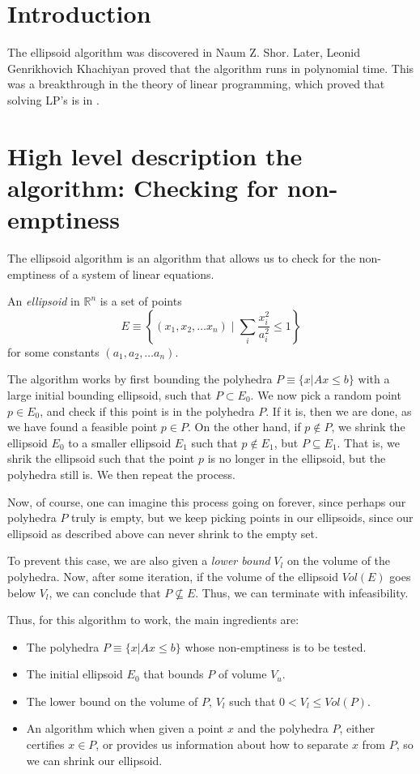 \documentclass[conference]{IEEEtran}
\begin{document}
\section{Introduction}
The ellipsoid algorithm was discovered in Naum Z. Shor. Later, 
Leonid Genrikhovich Khachiyan proved that the algorithm runs in polynomial
time. This was a breakthrough in the theory of linear programming, which
proved that solving LP's is in \PTIME.

\section{High level description the algorithm: Checking for non-emptiness}
The ellipsoid algorithm is an algorithm that allows us to check for the
non-emptiness of a system of linear equations. 


An \textit{ellipsoid} in $\mathbb{R}^n$ is a set of points
\[E \equiv \left\{ (x_1, x_2, \dots x_n) \mid \sum_i \frac{x_i^2}{a_i^2} \leq 1 \right\}\] for some
constants $(a_1, a_2, \dots a_n)$. 

The algorithm works by first bounding the polyhedra $P \equiv \{ x | Ax \leq b \}$ 
with a large initial bounding ellipsoid, such that $P \subset E_0$. We now pick a
random point $p \in E_0$, and check if this point is in the polyhedra $P$. If it
is, then we are done, as we have found a feasible point $p \in P$. On the
other hand, if $p \notin P$, we shrink the ellipsoid $E_0$ to a smaller
ellipsoid $E_1$ such that $p \notin E_1$, but $P \subseteq E_1$. That is,
we shrik the ellipsoid such that the point $p$ is no longer in the ellipsoid,
but the polyhedra still is. We then repeat the process.

Now, of course, one can imagine this process going on forever, since perhaps
our polyhedra $P$ truly is empty, but we keep picking points in our ellipsoids,
since our ellipsoid as described above can never shrink to the empty set.

To prevent this case, we are also given a \textit{lower bound} $V_l$ on the volume
of the polyhedra. Now, after some iteration, if the volume of the ellipsoid $Vol(E)$
goes below $V_l$, we can conclude that $P \not\subseteq E$. Thus, we can
terminate with infeasibility.

Thus, for this algorithm to work, the main ingredients are:
\begin{itemize}
\item The polyhedra $P \equiv \{ x | Ax \leq b \}$ whose non-emptiness
                is to be tested.
\item The initial ellipsoid $E_0$ that bounds $P$ of volume $V_u$.
\item The lower bound on the volume of $P$, $V_l$ such that $0 < V_l \leq
        Vol(P)$. 
\item An algorithm which when given a point $x$ and the polyhedra $P$, either
        certifies $x \in P$, or provides us information about how to separate
                $x$ from $P$, so we can shrink our ellipsoid.
\end{itemize}
\end{document}
